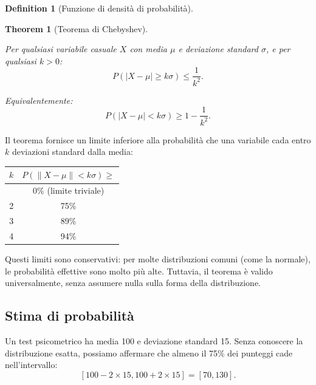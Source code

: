 \documentclass[
  letterpaper,
  DIV=11,
  numbers=noendperiod,
  oneside]{scrreprt}
\theoremstyle{definition}
\theoremstyle{plain}
\newtheorem{theorem}{Theorem}[chapter]
\theoremstyle{definition}
\newtheorem{definition}{Definition}[chapter]
\theoremstyle{remark}
\begin{document}
\begin{definition}[Funzione di densità di
probabilità]
\begin{theorem}[Teorema di
Chebyshev]\protect\hypertarget{thm-chebyshev}{}\label{thm-chebyshev}

Per qualsiasi variabile casuale \(X\) con media \(\mu\) e deviazione
standard \(\sigma\), e per qualsiasi \(k > 0\): \[
P(|X - \mu| \geq k\sigma) \leq \frac{1}{k^2}.
\]

Equivalentemente: \[
P(|X - \mu| < k\sigma) \geq 1 - \frac{1}{k^2}.
\]

\end{theorem}

Il teorema fornisce un limite inferiore alla probabilità che una
variabile cada entro \(k\) deviazioni standard dalla media:

\begin{longtable}[]{@{}cc@{}}
\toprule\noalign{}
\(k\) & \(P(\|X - \mu\| < k\sigma) \geq\) \\
\midrule\noalign{}
\endhead
\bottomrule\noalign{}
\endlastfoot
1 & 0\% (limite triviale) \\
2 & 75\% \\
3 & 89\% \\
4 & 94\% \\
\end{longtable}

Questi limiti sono conservativi: per molte distribuzioni comuni (come la
normale), le probabilità effettive sono molto più alte. Tuttavia, il
teorema è valido universalmente, senza assumere nulla sulla forma della
distribuzione.

\begin{tcolorbox}[enhanced jigsaw, arc=.35mm, breakable, colbacktitle=quarto-callout-note-color!10!white, opacityback=0, toprule=.15mm, rightrule=.15mm, colback=white, opacitybacktitle=0.6, leftrule=.75mm, coltitle=black, bottomtitle=1mm, left=2mm, toptitle=1mm, title=\textcolor{quarto-callout-note-color}{\faInfo}\hspace{0.5em}{Esempio: Applicazione del teorema di Chebyshev}, titlerule=0mm, bottomrule=.15mm, colframe=quarto-callout-note-color-frame]

\subsection{Stima di probabilità}\label{stima-di-probabilituxe0}

Un test psicometrico ha media 100 e deviazione standard 15. Senza
conoscere la distribuzione esatta, possiamo affermare che almeno il 75\%
dei punteggi cade nell'intervallo: \[
[100 - 2 \times 15, 100 + 2 \times 15] = [70, 130].
\]


\end{tcolorbox}
\end{definition}
\end{document}
